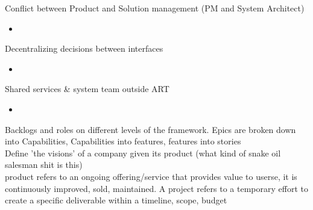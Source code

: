 \documentclass[10pt]{article}
\begin{document}
Conflict between Product and Solution management (PM and System Architect)
\begin{itemize}
\item 
\end{itemize}
Decentralizing decisions between interfaces
\begin{itemize}
\item 
\end{itemize}
Shared services \& system team outside ART
\begin{itemize}
\item 
\end{itemize}
Backlogs and roles on different levels of the framework. Epics are broken down into Capabilities, Capabilities into features, features into stories\\
Define 'the visions' of a company given its product (what kind of snake oil salesman shit is this)\\

product refers to an ongoing offering/service that provides value to userse, it is continuously improved, sold, maintained. A project refers to a temporary effort to create a specific deliverable within a timeline, scope, budget
\end{document}
